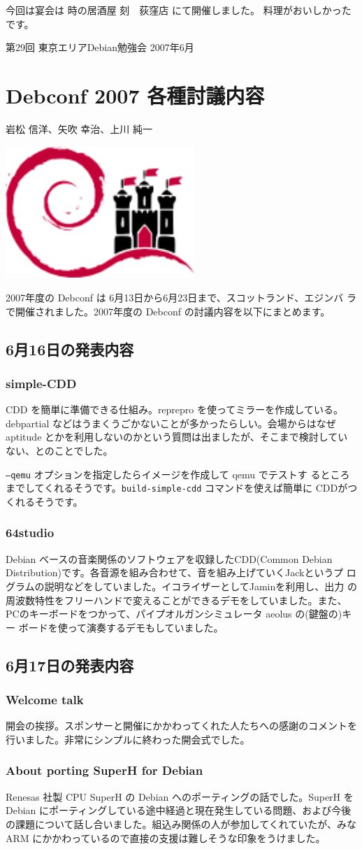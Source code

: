 \documentclass[mingoth,a4paper]{jsarticle}
\newcommand{\debmtgyear}{2007}
\newcommand{\debmtgmonth}{6}
\newcommand{\debmtgnumber}{29}
\newcommand{\debconfsection}[2]{%
\newpage
第\debmtgnumber{}回 東京エリアDebian勉強会 \debmtgyear{}年\debmtgmonth{}月
%
\vspace{0.1mm}\\
\colorbox{dancerlightblue}{\hspace{\hsize}}
%
%
\begin{minipage}[t]{0.7\hsize}
\color{dancerdarkblue}
\vspace{1cm}
\section{#1}
\hfill{}#2\\
\end{minipage}
\begin{minipage}[t]{0.3\hsize}
\vspace{-2cm}
\hfill{}\includegraphics[height=5cm]{image200706/logo-banner-split1.png}\\
\vspace{-5cm}
\end{minipage}
%
%
\colorbox{dancerdarkblue}{\hspace{\hsize}}
%
\vspace{2cm}
}
\begin{document}
今回は宴会は
時の居酒屋  刻　荻窪店
にて開催しました。
料理がおいしかったです。

\debconfsection{Debconf 2007 各種討議内容}{岩松 信洋、矢吹 幸治、上川 純一}
\label{sec:debconf2007detail}

2007年度の Debconf は 6月13日から6月23日まで、スコットランド、エジンバ
ラで開催されました。2007年度の Debconf の討議内容を以下にまとめます。


\subsection{6月16日の発表内容}
\subsubsection{simple-CDD}

CDD を簡単に準備できる仕組み。reprepro を使ってミラーを作成している。
debpartial などはうまくうごかないことが多かったらしい。会場からはなぜ
aptitude とかを利用しないのかという質問は出ましたが、そこまで検討してい
ない、とのことでした。

\texttt{--qemu} オプションを指定したらイメージを作成して qemu でテストす
るところまでしてくれるそうです。\texttt{build-simple-cdd} コマンドを使えば簡単に
CDDがつくれるそうです。

\subsubsection{64studio}
Debian ベースの音楽関係のソフトウェアを収録したCDD(Common Debian
Distribution)です。各音源を組み合わせて、音を組み上げていくJackというプ
ログラムの説明などをしていました。イコライザーとしてJaminを利用し、出力
の周波数特性をフリーハンドで変えることができるデモをしていました。また、
PCのキーボードをつかって、パイプオルガンシミュレータ aeolus の(鍵盤の)キー
ボードを使って演奏するデモもしていました。

\subsection{6月17日の発表内容}
\subsubsection{Welcome talk}
  開会の挨拶。スポンサーと開催にかかわってくれた人たちへの感謝のコメントを
  行いました。非常にシンプルに終わった開会式でした。
	
\subsubsection{About porting SuperH for Debian}
  Renesas 社製 CPU SuperH の Debian へのポーティングの話でした。SuperH を 
  Debian にポーティングしている途中経過と現在発生している問題、および今後
  の課題について話し合いました。組込み関係の人が参加してくれていたが、みな 
  ARM にかかわっているので直接の支援は難しそうな印象をうけました。
\end{document}
